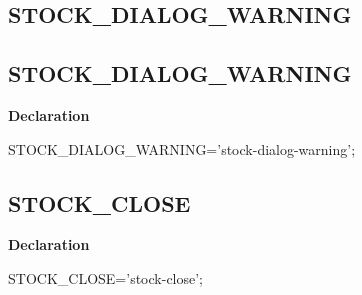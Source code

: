 \documentclass{report}
\newif\ifpdf
\begin{document}
\subsection*{\large{\textbf{STOCK{\_}DIALOG{\_}WARNING}}\normalsize\hspace{1ex}\hrulefill}
\else
\subsection*{STOCK{\_}DIALOG{\_}WARNING}
\fi
\label{licommon-STOCK_DIALOG_WARNING}
\begin{list}{}{
\setlength{\itemindent}{0cm}
\setlength{\listparindent}{0cm}
\setlength{\leftmargin}{\evensidemargin}
\addtolength{\leftmargin}{\tmplength}
\settowidth{\labelsep}{X}
\addtolength{\leftmargin}{\labelsep}
\setlength{\labelwidth}{\tmplength}
}
\item[\textbf{Declaration}\hfill]
\ifpdf
\begin{flushleft}
\fi
\begin{ttfamily}
STOCK{\_}DIALOG{\_}WARNING='stock-dialog-warning';\end{ttfamily}

\ifpdf
\end{flushleft}
\fi

\end{list}
\ifpdf
\subsection*{\large{\textbf{STOCK{\_}CLOSE}}\normalsize\hspace{1ex}\hrulefill}
\else
\subsection*{STOCK{\_}CLOSE}
\fi
\label{licommon-STOCK_CLOSE}
\begin{list}{}{
\setlength{\itemindent}{0cm}
\setlength{\listparindent}{0cm}
\setlength{\leftmargin}{\evensidemargin}
\addtolength{\leftmargin}{\tmplength}
\settowidth{\labelsep}{X}
\addtolength{\leftmargin}{\labelsep}
\setlength{\labelwidth}{\tmplength}
}
\item[\textbf{Declaration}\hfill]
\ifpdf
\begin{flushleft}
\fi
\begin{ttfamily}
STOCK{\_}CLOSE='stock-close';\end{ttfamily}

\ifpdf
\end{flushleft}
\fi

\end{list}
\ifpdf
\end{document}
